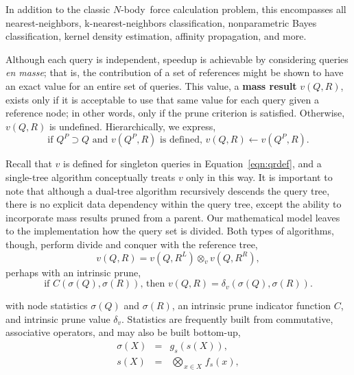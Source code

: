 \documentclass[twoside,leqno,twocolumn]{article}
\newcommand{\summary}{\delta}
\newcommand{\defterm}[1]{{\bf #1}}
\newcommand{\nbody}{$N$-body}
\newcommand{\kdleft}[1]{#1^{\!L}}
\newcommand{\kdright}[1]{#1^{\!R}}
\newcommand{\kdparent}[1]{#1^{\!P}}
\newcommand{\nameOp}[2]{\mathop{#1\nolimits\!\!_{#2}}}
\newcommand{\nameop}[2]{#1_{\!#2}}
\newcommand{\myOp}[1]{\nameOp{\bigotimes}{#1}}
\newcommand{\myop}[1]{\nameop{\otimes}{#1}}
\newcommand{\letterqr}{v}
\newcommand{\opqr}{\myop{\letterqr}}
\newcommand{\letterqrv}{v}
\newcommand{\inqrv}{v}
\newcommand{\deltaqrv}{\summary_{\letterqrv}}
\newcommand{\canpruneqrv}{C}%
\newcommand{\letterstat}{s}
\newcommand{\outstat}{\sigma}
\newcommand{\instat}{s}
\newcommand{\Opstat}{\myOp{\letterstat}}
\newcommand{\fstat}{f_{\letterstat}}
\newcommand{\gstat}{g_{\letterstat}}
\begin{document}
\noindent
In addition to the classic \nbody\ force calculation problem, this encompasses all nearest-neighbors, k-nearest-neighbors classification, nonparametric Bayes classification, kernel density estimation, affinity propagation, and more.

Although each query is independent, speedup is achievable by considering queries {\it en masse}; that is, the contribution of a set of references might be shown to have an exact value for an entire set of queries.
This value, a \defterm{mass result} $\inqrv(Q, R)$, exists only if it is acceptable to use that same value for each query given a reference node; in other words, only if the prune criterion is satisfied.
Otherwise, $\inqrv(Q,R)$ is undefined.
Hierarchically, we express,
\begin{equation}
\text{if } \kdparent{Q} \supset Q \text{ and }\inqrv(\kdparent{Q}, R)\text{ is defined, } \inqrv(Q, R) \gets \inqrv(\kdparent{Q}, R).
\label{eqn:qrvparent}
\end{equation}

\noindent
Recall that $\inqrv$ is defined for singleton queries in Equation~\ref{eqn:qrdef}, and a single-tree algorithm conceptually treats $\inqrv$ only in this way.
It is important to note that although a dual-tree algorithm recursively descends the query tree, there is no explicit data dependency within the query tree, except the ability to incorporate mass results pruned from a parent.
Our mathematical model leaves to the implementation how the query set is divided.
Both types of algorithms, though, perform divide and conquer with the reference tree,
\begin{equation}
\inqrv(Q, R) = \inqrv(Q, \kdleft{R}) \opqr \inqrv(Q, \kdright{R}),
\label{eqn:qrvcompose}
\end{equation}
\noindent perhaps with an intrinsic prune,
\begin{equation}
\text{if } \canpruneqrv(\outstat(Q), \outstat(R)) \text{, then } \inqrv(Q, R) = \deltaqrv(\outstat(Q), \outstat(R)).
\label{eqn:qrvprune}
\end{equation}

\noindent
with node statistics $\outstat(Q)$ and $\outstat(R)$, an intrinsic prune indicator function $\canpruneqrv$, and intrinsic prune value $\deltaqrv$.
Statistics are frequently built from commutative, associative operators, and may also be built bottom-up,
\begin{eqnarray}
\outstat(X) &=& \gstat(\instat(X)),
\\
\instat(X) &=& \Opstat_{x \in X} \fstat(x),
\label{eqn:defstat}
\end{eqnarray}
\end{document}

